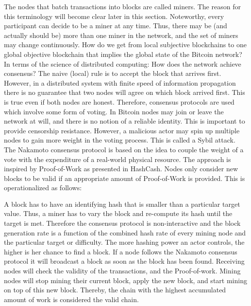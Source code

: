 The nodes that batch transactions into blocks are called miners. The reason for this terminology will become clear later in this section. Noteworthy, every participant can decide to be a miner at any time. Thus, there may be (and actually should be) more than one miner in the network, and the set of miners may change continuously. How do we get from local subjective blockchains to one global objective blockchain that implies the global state of the Bitcoin network? In terms of the science of distributed computing: How does the network achieve consensus?
The naive (local) rule is to accept the block that arrives first. However, in a distributed system with finite speed of information propagation there is no guarantee that two nodes will agree on which block arrived first. This is true even if both nodes are honest. Therefore, consensus protocols are used which involve some form of voting. In Bitcoin nodes may join or leave the network at will, and there is no notion of a reliable identity. This is important to provide censorship resistance. However, a malicious actor may spin up multiple nodes to gain more weight in the voting process. This is called a Sybil attack. The Nakamoto consensus protocol is based on the idea to couple the weight of a vote with the expenditure of a real-world physical resource. The approach is inspired by Proof-of-Work as presented in HashCash. Nodes only consider new blocks to be valid if an appropriate amount of Proof-of-Work is provided. This is operationalized as follows:

A block has to have an identifying hash that is smaller than a particular target value. Thus, a miner has to vary the block and re-compute its hash until the target is met. Therefore the consensus protocol is non-interactive and the block generation rate is a function of the combined hash rate of every mining node and the particular target or difficulty. The more hashing power an actor controls, the higher is her chance to find a block. If a node follows the Nakamoto consensus protocol it will broadcast a block as soon as the block has been found. Receiving nodes will check the validity of the transactions, and the Proof-of-work. Mining nodes will stop mining their current block, apply the new block, and start mining on top of this new block. Thereby, the chain with the highest accumulated amount of work is considered the valid chain. 

